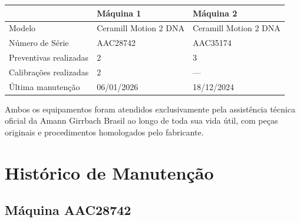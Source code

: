 \documentclass[12pt, a4paper]{article}
\begin{document}
\begin{table}[H]
    \centering
    \renewcommand{\arraystretch}{1.4}
    \begin{tabularx}{\textwidth}{@{} l X X @{}}
        \toprule
        \rowcolor{tableHeader} & \textbf{Máquina 1} & \textbf{Máquina 2} \\
        \midrule
        Modelo & Ceramill Motion 2 DNA & Ceramill Motion 2 DNA \\
        \rowcolor{lightGray}
        Número de Série & AAC28742 & AAC35174 \\
        Preventivas realizadas & 2 & 3 \\
        \rowcolor{lightGray}
        Calibrações realizadas & 2 & --- \\
        Última manutenção & 06/01/2026 & 18/12/2024 \\
        \bottomrule
    \end{tabularx}
\end{table}

Ambos os equipamentos foram atendidos exclusivamente pela assistência técnica oficial da Amann Girrbach Brasil ao longo de toda sua vida útil, com peças originais e procedimentos homologados pelo fabricante.

\pagebreak

\section{Histórico de Manutenção}

\subsection{Máquina AAC28742}
\end{document}
